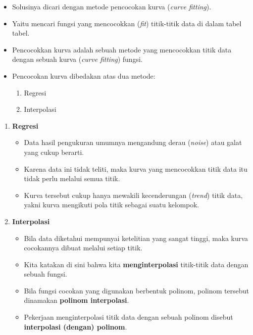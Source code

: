 \documentclass[pdflatex,compress,mathserif]{beamer}
\begin{document}
\begin{frame}
	\begin{itemize}
		\item Solusinya dicari dengan metode pencocokan kurva (\textit{curve fitting}).
		\item Yaitu mencari fungsi yang mencocokkan (\textit{fit}) titik-titik data di dalam tabel tabel.
		\item Pencocokkan kurva adalah sebuah metode yang mencocokkan titik data dengan sebuah kurva (\textit{curve fitting}) fungsi.
		\item Pencocokan kurva dibedakan atas dua metode:
		\begin{enumerate}
			\item Regresi
			\item Interpolasi
		\end{enumerate}
	\end{itemize}
\end{frame}

\begin{frame}
	\begin{enumerate}
		\item \textbf{Regresi}
		\begin{itemize}
			\item Data hasil pengukuran umumnya mengandung derau (\textit{noise}) atau galat yang cukup berarti.
			\item Karena data ini tidak teliti, maka kurva yang mencocokkan titik data itu tidak perlu melalui semua titik.
			\item Kurva tersebut cukup hanya mewakili kecenderungan (\textit{trend}) titik data, yakni kurva mengikuti pola titik sebagai suatu kelompok.
		\end{itemize}
	\end{enumerate}
\end{frame}

\begin{frame}
	\begin{enumerate}
		\setcounter{enumi}{1}
		\item \textbf{Interpolasi}
		\begin{itemize}
			\item Bila data diketahui mempunyai ketelitian yang sangat tinggi, maka kurva cocokannya dibuat melalui setiap titik.
			\item Kita katakan di sini bahwa kita \textbf{menginterpolasi} titik-titik data dengan sebuah fungsi.
			\item Bila fungsi cocokan yang digunakan berbentuk polinom, polinom tersebut dinamakan \textbf{polinom interpolasi}.
			\item Pekerjaan menginterpolasi titik data dengan sebuah polinom disebut \textbf{interpolasi (dengan) polinom}.
		\end{itemize}
	\end{enumerate}
\end{frame}
\end{document}
